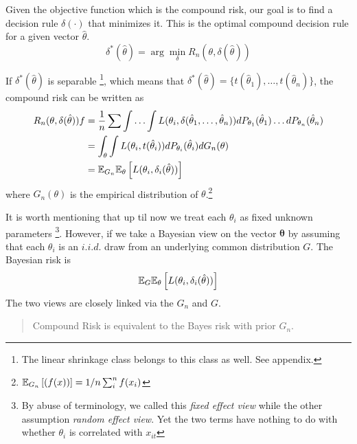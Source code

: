 \documentclass[12pt]{article}
\begin{document}
Given the objective function which is the compound risk, our goal is to find a
decision rule $\delta(\cdot)$ that minimizes it. This is the optimal compound
decision rule for a given vector $\hat{\theta}$.
\begin{equation*}
    {\delta}^*(\hat{\theta}) =
    \arg\min_{\delta} R_n(\theta, \delta(\hat{\theta}))
\end{equation*}

If $\delta^*(\hat{\theta})$ is separable \footnote{The linear shrinkage class
    belongs to this class as well. See appendix.}, which means that
$\delta^*(\hat{\theta})=\{t(\hat{\theta}_1), \ldots, t(\hat{\theta}_n)\}$, the
compound risk can be written as
\begin{align*}
    R_n(\theta, \delta(\hat{\theta})) f & =  \frac{1}{n}\sum \int\ldots\int L(\theta_i, \delta(\hat{\theta}_1,\dots,\hat{\theta}_n))dP_{\theta_1}(\hat{\theta}_1)\ldots dP_{\theta_n}(\hat{\theta}_n) \\
                                        & = \int_{\theta} \int L(\theta_i, t(\hat{\theta}_i))dP_{\theta_i}(\hat{\theta}_i)dG_n(\theta)                                                                \\
                                        & =\mathbb{E}_{G_n}{\mathbb{E}_\theta\left[L(\theta_i, \delta_i(\hat{\theta}))\right]}                                                                                               \\
\end{align*}
where $G_n(\theta)$ is the empirical distribution of $\theta$.\footnote{ $\mathbb{E}_{G_n}\left[(f(x))\right] = 1/n \sum_i^n f(x_i)$}

It is worth mentioning that up til now we treat each $\theta_i$ as fixed
unknown parameters \footnote{By abuse of terminology, we called this
    \textit{fixed effect view} while the other assumption \textit{random effect
        view}. Yet the two terms have nothing to do with whether $\theta_i$ is
    correlated with $x_{it}$}. However, if we take a Bayesian view on the vector
$\boldsymbol{\theta}$ by assuming that each $\theta_i$ is an $i.i.d.$ draw from
an underlying common distribution $G$. The Bayesian risk is
\begin{equation*}
    \mathbb{E}_{G}{\mathbb{E}_\theta\left[L(\theta_i, \delta_i(\hat{\theta}))\right]}
\end{equation*}
The two views are closely linked via the $G_n$ and $G$.

\begin{quotation}
    Compound Risk is equivalent to the Bayes risk with prior $G_n$.
\end{quotation}
\end{document}
